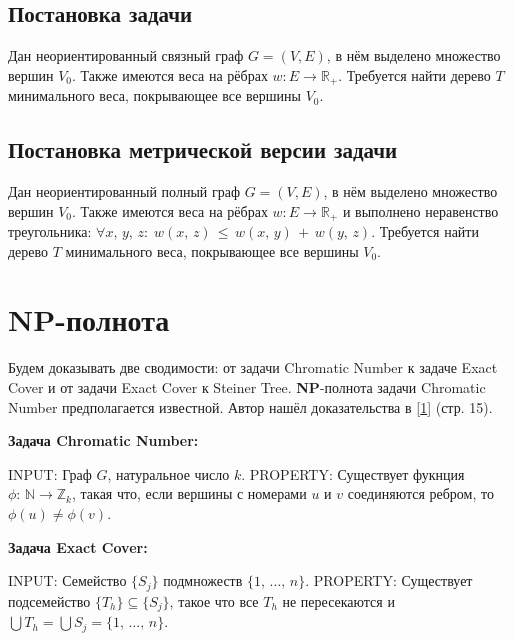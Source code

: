 \documentclass[a4paper,12pt]{article}
\begin{document}
    \subsection{Постановка задачи}

    Дан неориентированный связный граф $G = (V, E)$, в нём выделено множество вершин $V_0$. Также имеются веса на рёбрах $w : E \to \mathbb{R}_+$. Требуется найти дерево $T$ минимального веса, покрывающее все вершины $V_0$.

    \subsection{Постановка метрической версии задачи}

    Дан неориентированный полный граф $G = (V, E)$, в нём выделено множество вершин $V_0$. Также имеются веса на рёбрах $w : E \to \mathbb{R}_+$ и выполнено неравенство треугольника: $\forall x, \, y, \, z: \; w(x, \, z) \, \leqslant \, w(x, \, y) \, + \, w(y, \, z)$. Требуется найти дерево $T$ минимального веса, покрывающее все вершины $V_0$.

    \vfill \newpage

    \section{NP-полнота}

    Будем доказывать две сводимости: от задачи Chromatic Number к задаче Exact Cover и от задачи Exact Cover к Steiner Tree. \textbf{NP}-полнота задачи Chromatic Number предполагается известной. Автор нашёл доказательства в [\href{https://cgi.di.uoa.gr/~sgk/teaching/grad/handouts/karp.pdf}{1}] (стр. 15).\newline

    \noindent\textbf{Задача Chromatic Number:}
    \begin{task}
        INPUT: \; Граф $G$, натуральное число $k$.\newline
        PROPERTY: \; Существует фукнция $\phi: \, \mathbb{N} \to \mathbb{Z}_k$, такая что, если вершины с номерами $u$ и $v$ соединяются ребром, то $\phi(u) \neq \phi(v)$.
    \end{task}

    \noindent\textbf{Задача Exact Cover:}
    \begin{task}
        INPUT: \; Семейство $\{S_j\}$ подмножеств $\{1, \, \dots, \, n\}$.\newline
        PROPERTY: \; Существует подсемейство $\{T_h\} \subseteq \{S_j\}$, такое что все $T_h$ не пересекаются и $\bigcup T_h = \bigcup S_j = \{1, \, \dots, \, n\}$.
    \end{task}
\end{document}
